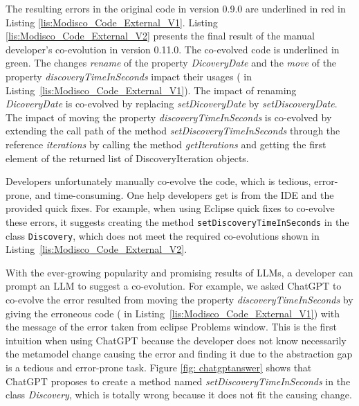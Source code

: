 The resulting errors in the original code in version 0.9.0 are underlined in red in Listing \ref{lis:Modisco_Code_External_V1}. Listing \ref{lis:Modisco_Code_External_V2} presents the final result of the manual developer's co-evolution in version 0.11.0. The co-evolved code is underlined in green. 
The changes \textit{rename} of the property \textit{ DicoveryDate} and the \textit{move} of the property \emph{discoveryTimeInSeconds} impact their usages ({\small{}} in Listing~\ref{lis:Modisco_Code_External_V1}). The impact of renaming \textit{ DicoveryDate} is co-evolved by replacing \textit{setDicoveryDate} by \textit{setDiscoveryDate}. The impact of moving the property \emph{discoveryTimeInSeconds} is co-evolved by extending the call path of the method \emph{setDiscoveryTimeInSeconds} through the reference \textit{iterations} by calling the method \textit{getIterations} and getting the first element of the returned list of DiscoveryIteration objects.

Developers unfortunately manually co-evolve the code, which is tedious, error-prone, and time-consuming. 
One help developers get is from the IDE and the provided quick fixes. For example, when using Eclipse quick fixes to co-evolve these errors, it suggests creating the method \texttt{setDiscoveryTimeInSeconds} in the class \texttt{Discovery}, which does not meet the required co-evolutions shown in Listing~\ref{lis:Modisco_Code_External_V2}.

With the ever-growing popularity and promising results of LLMs, a developer can prompt an LLM to suggest a co-evolution. 
For example, 
we asked ChatGPT to co-evolve the error resulted from moving the property \emph{discoveryTimeInSeconds} by giving the erroneous code ({\small{}} in Listing~\ref{lis:Modisco_Code_External_V1})  with the message of the error taken from eclipse Problems window. This is the first intuition when using ChatGPT because the developer does not know necessarily the metamodel change causing the error and finding it due to the abstraction gap is a tedious and error-prone task. Figure \ref{fig: chatgptanswer} shows that ChatGPT proposes to create a method named \emph{setDiscoveryTimeInSeconds} in the class \emph{Discovery}, which is totally wrong because it does not fit the causing change. 

